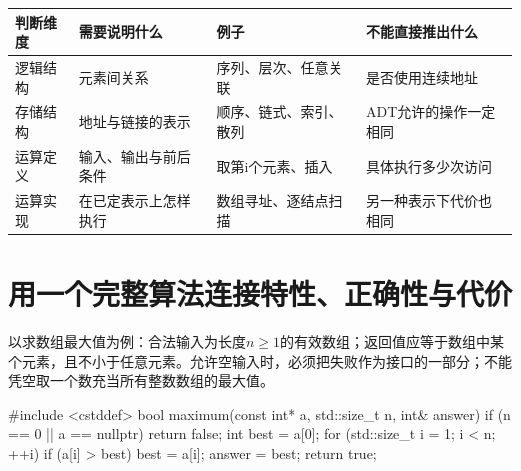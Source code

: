 \begin{wideblock}

\par\medskip\noindent\begin{minipage}{\linewidth}\fontsize{9.3}{12}\selectfont\begin{tabularx}{\linewidth}{@{}YYYY@{}}
\toprule\noalign{}
\begin{minipage}[b]{\linewidth}\raggedright
判断维度
\end{minipage} & \begin{minipage}[b]{\linewidth}\raggedright
需要说明什么
\end{minipage} & \begin{minipage}[b]{\linewidth}\raggedright
例子
\end{minipage} & \begin{minipage}[b]{\linewidth}\raggedright
不能直接推出什么
\end{minipage} \\
\midrule\noalign{}


逻辑结构 & 元素间关系 & 序列、层次、任意关联 & 是否使用连续地址 \\
存储结构 & 地址与链接的表示 & 顺序、链式、索引、散列 & ADT允许的操作一定相同 \\
运算定义 & 输入、输出与前后条件 & 取第i个元素、插入 & 具体执行多少次访问 \\
运算实现 & 在已定表示上怎样执行 & 数组寻址、逐结点扫描 & 另一种表示下代价也相同 \\
\bottomrule\end{tabularx}
\end{minipage}\par\medskip

\end{wideblock}

\section{用一个完整算法连接特性、正确性与代价}\label{DS01-code}

\begin{methodbox}

以求数组最大值为例：合法输入为长度\(n\ge1\)的有效数组；返回值应等于数组中某个元素，且不小于任意元素。允许空输入时，必须把失败作为接口的一部分；不能凭空取一个数充当所有整数数组的最大值。

\end{methodbox}

\begin{codeblock}[language=C++]
#include <cstddef>
bool maximum(const int* a, std::size_t n, int& answer) {
    if (n == 0 || a == nullptr) return false;
    int best = a[0];
    for (std::size_t i = 1; i < n; ++i)
        if (a[i] > best) best = a[i];
    answer = best;
    return true;
}
\end{codeblock}

